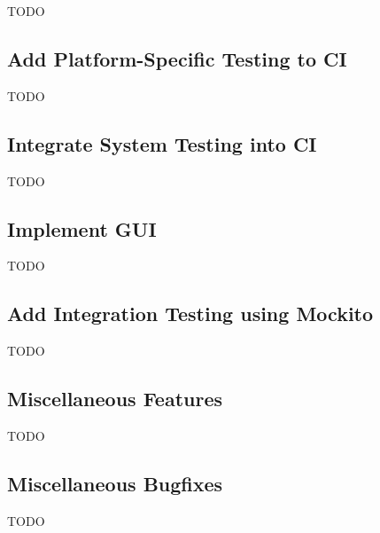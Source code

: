 TODO

\subsection{Add Platform-Specific Testing to CI}\label{subsection:add_platform_specific_testing_to_ci}

TODO

\subsection{Integrate System Testing into CI}\label{subsection:integrate_system_testing_into_ci}

TODO

\subsection{Implement GUI}\label{subsection:implement_gui}

TODO

\subsection{Add Integration Testing using Mockito}\label{subsection:add_integration_testing_using_mockito}

TODO

\subsection{Miscellaneous Features}\label{subsection:miscellaneous_features}

TODO

\subsection{Miscellaneous Bugfixes}\label{subsection:miscellaneous_bugfixes}

TODO
